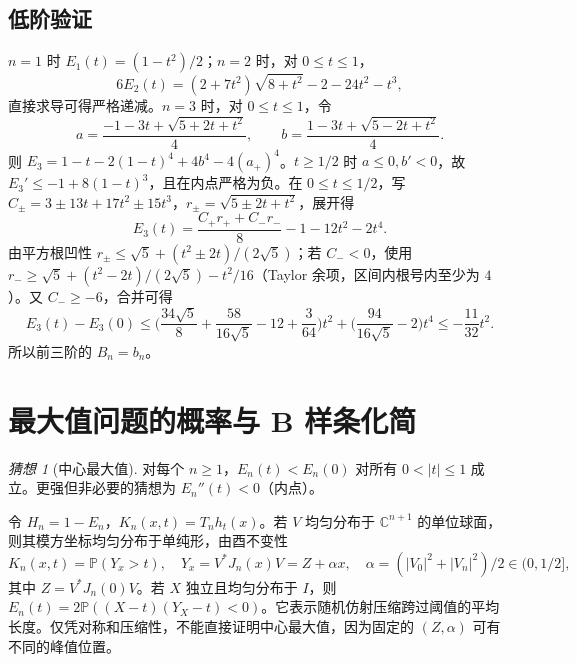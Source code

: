 \documentclass[11pt,a4paper,fontset=fandol]{ctexart}
\newcommand{\Prob}{\mathbb P}
\theoremstyle{remark}\newtheorem{conjecture}{猜想}
\begin{document}
\subsection{低阶验证}
$n=1$ 时 $E_1(t)=(1-t^2)/2$；$n=2$ 时，对 $0\le t\le1$，
\[
 6E_2(t)=(2+7t^2)\sqrt{8+t^2}-2-24t^2-t^3,
\]
直接求导可得严格递减。$n=3$ 时，对 $0\le t\le1$，令
\[
 a=\frac{-1-3t+\sqrt{5+2t+t^2}}4,\qquad b=\frac{1-3t+\sqrt{5-2t+t^2}}4.
\]
则 $E_3=1-t-2(1-t)^4+4b^4-4(a_+)^4$。$t\ge1/2$ 时 $a\le0,b'<0$，故 $E_3'\le-1+8(1-t)^3$，且在内点严格为负。在 $0\le t\le1/2$，写 $C_\pm=3\pm13t+17t^2\pm15t^3$，$r_\pm=\sqrt{5\pm2t+t^2}$，展开得
\[
 E_3(t)=\frac{C_+r_++C_-r_-}{8}-1-12t^2-2t^4.
\]
由平方根凹性 $r_\pm\le\sqrt5+(t^2\pm2t)/(2\sqrt5)$；若 $C_-<0$，使用 $r_-\ge\sqrt5+(t^2-2t)/(2\sqrt5)-t^2/16$（Taylor 余项，区间内根号内至少为 $4$）。又 $C_-\ge-6$，合并可得
\[
 E_3(t)-E_3(0)\le\Big(\frac{34\sqrt5}8+\frac{58}{16\sqrt5}-12+\frac3{64}\Big)t^2
 +\Big(\frac{94}{16\sqrt5}-2\Big)t^4\le-\frac{11}{32}t^2.
\]
所以前三阶的 $B_n=b_n$。

\section{最大值问题的概率与 B 样条化简}\label{sec:prob}
\begin{conjecture}[中心最大值]\label{conj}
对每个 $n\ge1$，$E_n(t)<E_n(0)$ 对所有 $0<|t|\le1$ 成立。更强但非必要的猜想为 $E_n''(t)<0$（内点）。
\end{conjecture}
令 $H_n=1-E_n$，$K_n(x,t)=T_nh_t(x)$。若 $V$ 均匀分布于 $\mathbb C^{n+1}$ 的单位球面，则其模方坐标均匀分布于单纯形，由酉不变性
\begin{equation}\label{prob}
 K_n(x,t)=\Prob(Y_x>t),\quad Y_x=V^*J_n(x)V=Z+\alpha x,
 \quad \alpha=(|V_0|^2+|V_n|^2)/2\in(0,1/2],
\end{equation}
其中 $Z=V^*J_n(0)V$。若 $X$ 独立且均匀分布于 $I$，则 $E_n(t)=2\Prob((X-t)(Y_X-t)<0)$。它表示随机仿射压缩跨过阈值的平均长度。仅凭对称和压缩性，不能直接证明中心最大值，因为固定的 $(Z,\alpha)$ 可有不同的峰值位置。
\end{document}
